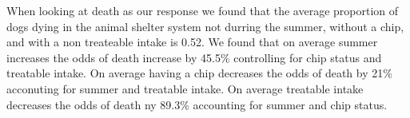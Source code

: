 \documentclass[]{article}
\newenvironment{Shaded}{\begin{snugshade}}{\end{snugshade}}
\newcommand{\KeywordTok}[1]{\textcolor[rgb]{0.13,0.29,0.53}{\textbf{#1}}}
\newcommand{\DataTypeTok}[1]{\textcolor[rgb]{0.13,0.29,0.53}{#1}}
\newcommand{\FloatTok}[1]{\textcolor[rgb]{0.00,0.00,0.81}{#1}}
\newcommand{\CharTok}[1]{\textcolor[rgb]{0.31,0.60,0.02}{#1}}
\newcommand{\StringTok}[1]{\textcolor[rgb]{0.31,0.60,0.02}{#1}}
\newcommand{\OtherTok}[1]{\textcolor[rgb]{0.56,0.35,0.01}{#1}}
\newcommand{\NormalTok}[1]{#1}
\begin{document}
When looking at death as our response we found that the average
proportion of dogs dying in the animal shelter system not durring the
summer, without a chip, and with a non treateable intake is 0.52. We
found that on average summer increases the odds of death increase by
45.5\% controlling for chip status and treatable intake. On average
having a chip decreases the odds of death by 21\% acconuting for summer
and treatable intake. On average treatable intake decreases the odds of
death ny 89.3\% accounting for summer and chip status.

\begin{Shaded}
\end{Shaded}
\end{document}
